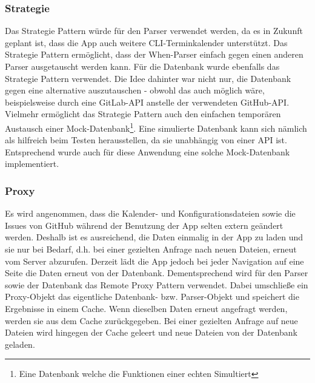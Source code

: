 \subsubsection{Strategie}
Das Strategie Pattern würde für den Parser verwendet werden, da es in Zukunft geplant ist, dass die App auch weitere CLI-Terminkalender unterstützt. Das Strategie Pattern ermöglicht, dass der When-Parser einfach gegen einen anderen Parser ausgetauscht werden kann. %
Für die Datenbank wurde ebenfalls das Strategie Pattern verwendet. %
	Die Idee dahinter war nicht nur, die Datenbank gegen eine alternative auszutauschen - obwohl das auch möglich wäre, beispielsweise durch eine GitLab-API anstelle der verwendeten GitHub-API. %
	Vielmehr ermöglicht das Strategie Pattern auch den einfachen temporären Austausch einer Mock-Datenbank\footnote{Eine Datenbank welche die Funktionen einer echten Simultiert}. Eine simulierte Datenbank kann sich nämlich als hilfreich beim Testen herausstellen, da sie unabhängig von einer API ist. Entsprechend wurde auch für diese Anwendung eine solche Mock-Datenbank implementiert. %
%
%
%
%
%
\subsubsection{Proxy}%
Es wird angenommen, dass die Kalender- und Konfigurationsdateien sowie die Issues von GitHub während der Benutzung der App selten extern geändert werden. Deshalb ist es ausreichend, die Daten einmalig in der App zu laden und sie nur bei Bedarf, d.h. bei einer gezielten Anfrage nach neuen Dateien, erneut vom Server abzurufen. Derzeit lädt die App jedoch bei jeder Navigation auf eine Seite die Daten erneut von der Datenbank.\newline%
Dementsprechend wird für den Parser sowie der Datenbank das Remote Proxy Pattern verwendet. Dabei umschließe ein Proxy-Objekt das eigentliche Datenbank- bzw. Parser-Objekt und speichert die Ergebnisse in einem Cache. Wenn dieselben Daten erneut angefragt werden, werden sie aus dem Cache zurückgegeben. Bei einer gezielten Anfrage auf neue Dateien wird hingegen der Cache geleert und neue Dateien von der Datenbank geladen.
%
%
%
%
%
